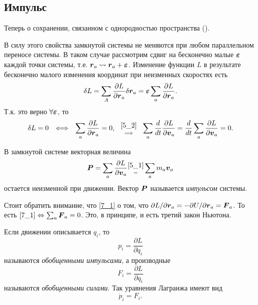 \subsection{Импульс}

Теперь о сохранении, связанном с однородностью пространства ().

В силу этого свойства замкнутой системы не меняются при любом параллельном переносе системы. В таком случае рассмотрим сдвиг на бесконечно малые $\mbox{\boldmath $\varepsilon$}$ каждой точки системы, т.е. $\mbox{\boldmath $r$}_a \leadsto \mbox{\boldmath $r$}_a + \mbox{\boldmath $\varepsilon$}$. Изменение функции $L$ в результате бесконечно малого изменения координат при неизменных скоростях есть
$$
    \delta L = \sum_A \frac{\partial L}{\partial \mbox{\boldmath $r$}_a} \delta \mbox{\boldmath $r$}_a =
    \mbox{\boldmath $\varepsilon$} \sum_a \frac{\partial L}{\partial \mbox{\boldmath $r$}_a}.
$$
Т.к. это верно $\forall \mbox{\boldmath $\varepsilon$}$, то 
\begin{equation}
\label{7_1}
    \delta L = 0 \hspace{0.25cm} \Longleftrightarrow \hspace{0.25cm} 
    \sum_a \frac{\partial L}{\partial \mbox{\boldmath $r$}_a} = 0,
    \hspace{0.25cm} \overset{\eqref{5_2}}{\underset{\Longrightarrow}{}} 
    \hspace{0.25cm} 
    \sum_a \frac{d}{dt} \frac{\partial L}{\partial \mbox{\boldmath $v$}_a} =
    \frac{d}{dt} \sum_a \frac{\partial L}{\partial \mbox{\boldmath $v$}_a} = 0.
\end{equation}

\begin{to_def} 
    В замкнутой системе векторная величина 
    \begin{equation}
         \mbox{\boldmath $P$} = \sum_a \frac{\partial L}{\partial \mbox{\boldmath $v$}_a} 
         \overset{\eqref{5_1}}{\underset{=}{}} 
         \sum_a m_a \mbox{\boldmath $v$}_a
     \end{equation}
    остается неизменной при движении. Вектор $\mbox{\boldmath $P$}$ называется \textit{импульсом} системы. 
\end{to_def}

Стоит обратить внимание, что \eqref{7_1} о том, что $\partial L / \partial \mbox{\boldmath $r$}_a = - \partial U / \partial \mbox{\boldmath $r$}_a = \mbox{\boldmath $F$}_a$. То есть $\eqref{7_1} \Leftrightarrow \sum_a \mbox{\boldmath $F$}_a = 0$. Это, в принципе, и есть третий закон Ньютона.



Если движении описывается $q_i$, то 
\begin{equation}
    p_i = \frac{\partial L}{\partial \dot{q}_i} 
\end{equation}
называются \textit{обобщенными импульсами}, а производные
\begin{equation}
    F_i = \frac{\partial L}{\partial q_i} 
\end{equation}
называются \textit{обобщенными силами}. Так уравнения Лагранжа имеют вид
\begin{equation}
    \dot{p}_i = F_i.
\end{equation}










